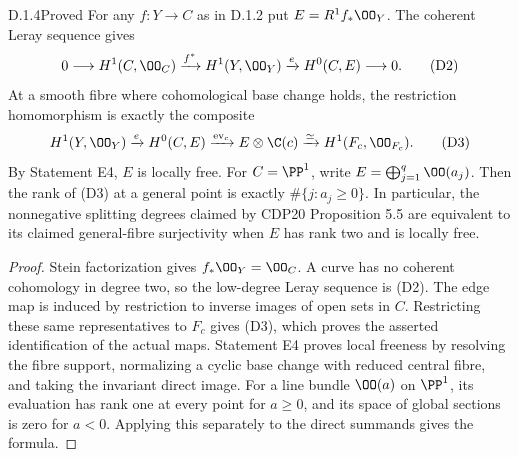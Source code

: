 \begin{idstatement}{D.1.4}{Proved}\label{st:D.1.4}
For any $f:Y\to C$ as in D.1.2 put $E=R^1f_*\OO_Y$.
The coherent Leray sequence gives
\[
0\longrightarrow H^1(C,\OO_C)\xrightarrow{f^*}H^1(Y,\OO_Y)
\xrightarrow{e}H^0(C,E)\longrightarrow0.               \tag{D2}
\]
At a smooth fibre where cohomological base change holds, the
restriction homomorphism is exactly the composite
\[
H^1(Y,\OO_Y)\xrightarrow{e}H^0(C,E)
\xrightarrow{\operatorname{ev}_c}E\otimes\C(c)
\xrightarrow{\simeq}H^1(F_c,\OO_{F_c}).               \tag{D3}
\]
By Statement E4, $E$ is locally free. For $C=\PP^1$, write
$E=\bigoplus_{j=1}^q\OO(a_j)$.
Then the rank of (D3) at a general point is exactly
$\#\{j:a_j\geq0\}$. In particular, the nonnegative splitting
degrees claimed by CDP20 Proposition 5.5 are equivalent to its
claimed general-fibre surjectivity when $E$ has rank two and is
locally free.
\end{idstatement}
\begin{proof}
Stein factorization gives $f_*\OO_Y=\OO_C$. A curve has no coherent
cohomology in degree two, so the low-degree Leray sequence is (D2).
The edge map is induced by restriction to inverse images of open
sets in $C$. Restricting these same representatives to $F_c$ gives
(D3), which proves the asserted identification of the actual maps.
Statement E4 proves local freeness by resolving the fibre support,
normalizing a cyclic base change with reduced central fibre, and
taking the invariant direct image. For a line bundle
$\OO(a)$ on $\PP^1$, its evaluation has rank one at every point
for $a\geq0$, and its space of global sections is zero for $a<0$.
Applying this separately to the direct summands gives the formula.
\end{proof}



